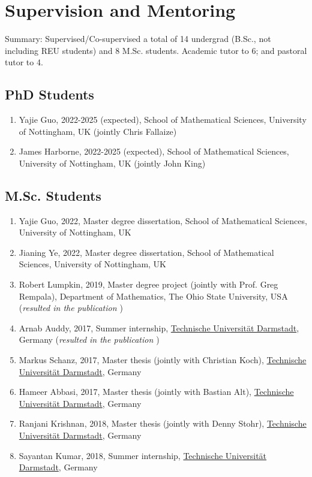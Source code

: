 \documentclass[11pt,a4paper,sans]{moderncv}        %
\begin{document}
%



\section{Supervision and Mentoring}
Summary: Supervised/Co-supervised a total of 14 undergrad (B.Sc., not including REU students)  and 8 M.Sc. students. Academic tutor to 6; and pastoral tutor to 4.%

\subsection{PhD Students}
\begin{enumerate}
	\item Yajie Guo, 2022-2025 (expected), School of Mathematical Sciences, University of Nottingham, UK (jointly Chris Fallaize)
	\item James Harborne, 2022-2025 (expected), School of Mathematical Sciences, University of Nottingham, UK (jointly John King)
\end{enumerate}

\subsection{M.Sc. Students}
\begin{enumerate}
	\item Yajie Guo, 2022, Master degree dissertation, School of Mathematical Sciences,  University of Nottingham, UK
	\item Jianing Ye, 2022, Master degree dissertation, School of Mathematical Sciences,  University of Nottingham, UK
	\item Robert Lumpkin, 2019, Master degree project (jointly with Prof. Greg Rempala), Department of Mathematics, The Ohio State University, USA (\emph{resulted in the publication \cite{biomath2019}})
	\item Arnab Auddy, 2017, Summer internship, \href{http://www.tu-darmstadt.de/index.en.jsp}{Technische Universit\"{a}t Darmstadt}, Germany (\emph{resulted in the publication \cite{KhudaBukhsh2018Lumpability}})
	\item Markus Schanz, 2017, Master thesis (jointly with Christian Koch), \href{http://www.tu-darmstadt.de/index.en.jsp}{Technische Universit\"{a}t Darmstadt}, Germany
	\item Hameer Abbasi, 2017, Master thesis (jointly with Bastian Alt), \href{http://www.tu-darmstadt.de/index.en.jsp}{Technische Universit\"{a}t Darmstadt}, Germany
	\item Ranjani Krishnan, 2018, Master thesis (jointly with Denny Stohr), \href{http://www.tu-darmstadt.de/index.en.jsp}{Technische Universit\"{a}t Darmstadt}, Germany
	\item Sayantan Kumar, 2018, Summer internship, \href{http://www.tu-darmstadt.de/index.en.jsp}{Technische Universit\"{a}t Darmstadt}, Germany 
\end{enumerate}
\end{document}
